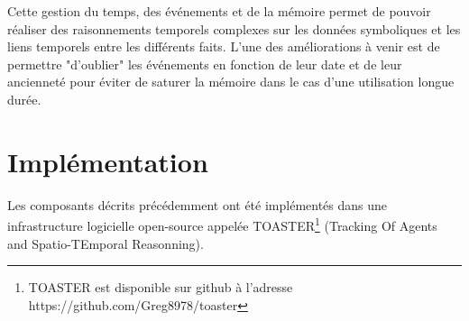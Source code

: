 \documentclass[a4paper,11pt,twoside]{StyleThese}
\begin{document}
Cette gestion du temps, des événements et de la mémoire permet de pouvoir réaliser des raisonnements temporels complexes sur les données symboliques et les liens temporels entre les différents faits. L'une des améliorations à venir est de permettre "d'oublier" les événements en fonction de leur date et de leur ancienneté pour éviter de saturer la mémoire dans le cas d'une utilisation longue durée.






\section{Implémentation}

Les composants décrits précédemment ont été implémentés dans une infrastructure logicielle open-source appelée TOASTER\footnote{TOASTER est disponible sur github à l'adresse https://github.com/Greg8978/toaster} (Tracking Of Agents and Spatio-TEmporal Reasonning).
\end{document}
